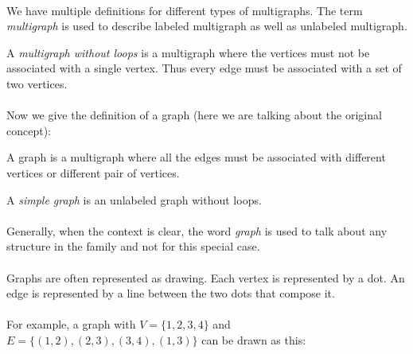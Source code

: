 \paragraph{}
We have multiple definitions for different types of multigraphs. The term \textit{multigraph} is used to describe labeled multigraph as well as unlabeled multigraph.

\begin{definition}
  A \textit{multigraph without loops} is a multigraph where the vertices must not be associated with a single vertex. Thus every edge must be associated with a set of two vertices.
\end{definition}

\paragraph{}
Now we give the definition of a graph (here we are talking about the original concept):

\begin{definition}[Graph]
  A graph is a multigraph where all the edges must be associated with different vertices or different pair of vertices.
\end{definition}

\begin{definition}
  A \textit{simple graph} is an unlabeled graph without loops.
\end{definition}

\paragraph{}
Generally, when the context is clear, the word \textit{graph} is used to talk about any structure in the family and not for this special case.

\paragraph{}
Graphs are often represented as drawing.  Each vertex is represented by a dot. An edge is represented by a line between the two dots that compose it.

\paragraph{}
For example, a graph with $V = \{1,2,3,4\}$ and $E = \{(1,2), (2,3), (3,4), (1,3)\}$ can be drawn as this:

